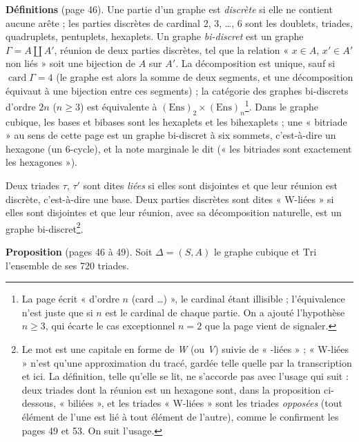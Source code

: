 \documentclass[11pt,a4paper]{article}
\begin{document}
\textbf{Définitions} (page 46). Une partie d'un graphe est \emph{discrète} si
elle ne contient aucune arête ; les parties discrètes de cardinal 2, 3,
\ldots, 6 sont les doublets, triades, quadruplets, pentuplets, hexaplets. Un
graphe \emph{bi-discret} est un graphe $\Gamma = A \amalg A'$, réunion de deux
parties discrètes, tel que la relation « $x \in A$, $x' \in A'$ non liés » soit
une bijection de $A$ sur $A'$. La décomposition est unique, sauf si
$\operatorname{card} \Gamma = 4$ (le graphe est alors la somme de deux segments,
et une décomposition équivaut à une bijection entre ces segments) ; la
catégorie des graphes bi-discrets d'ordre $2n$ ($n \geq 3$) est équivalente à
$(\mathrm{Ens})_2 \times (\mathrm{Ens})_n$\footnote{La page écrit « d'ordre $n$
(card \ldots) », le cardinal étant illisible ; l'équivalence n'est juste que si
$n$ est le cardinal de chaque partie. On a ajouté l'hypothèse $n \geq 3$, qui
écarte le cas exceptionnel $n = 2$ que la page vient de signaler.}. Dans le
graphe cubique, les bases et bibases sont les hexaplets et les
bihexaplets ; une « bitriade » au sens de cette page est un graphe bi-discret à
six sommets, c'est-à-dire un hexagone (un 6-cycle), et la note marginale le dit
(« les bitriades sont exactement les hexagones »).

Deux triades $\tau$, $\tau'$ sont dites \emph{liées} si elles sont disjointes
et que leur réunion est discrète, c'est-à-dire une base. Deux parties
discrètes sont dites « W-liées » si elles sont disjointes et que leur réunion,
avec sa décomposition naturelle, est un graphe bi-discret\footnote{Le mot est
une capitale en forme de \emph{W} (ou \emph{V}) suivie de « -liées » ; « W-liées »
n'est qu'une approximation du tracé, gardée telle quelle par la transcription
et ici. La définition, telle qu'elle se lit, ne s'accorde pas avec l'usage qui
suit : deux triades dont la réunion est un hexagone sont, dans la proposition
ci-dessous, « biliées », et les triades « W-liées » sont les triades
\emph{opposées} (tout élément de l'une est lié à tout élément de l'autre),
comme le confirment les pages 49 et 53. On suit l'usage.}.

\textbf{Proposition} (pages 46 à 49). Soit $\Delta = (S, A)$ le graphe cubique
et $\mathrm{Tri}$ l'ensemble de ses 720 triades.
\end{document}
